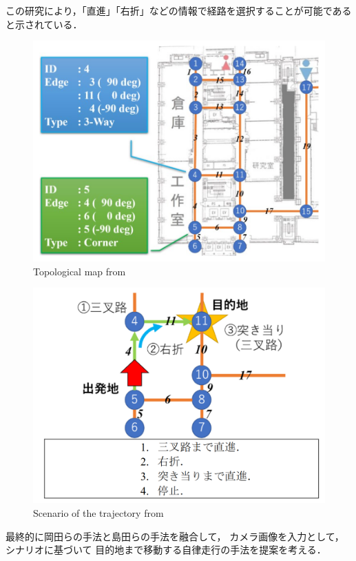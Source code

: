 この研究により，「直進」「右折」などの情報で経路を選択することが可能であると示されている．
\begin{figure}[H]
    \centering
    \includegraphics[width = 13cm]{./figs/topo.png}
    \caption{Topological map from\cite{simada}}
    \label{fig::topo}
\end{figure}
\begin{figure}[H]
    \centering
    \includegraphics[width = 13cm]{./figs/sina.png}
    \caption{Scenario of the trajectory from \cite{simada}}
    \label{fig::sina}
\end{figure}

最終的に岡田らの手法と島田らの手法を融合して，
カメラ画像を入力として，シナリオに基づいて
目的地まで移動する自律走行の手法を提案を考える．

